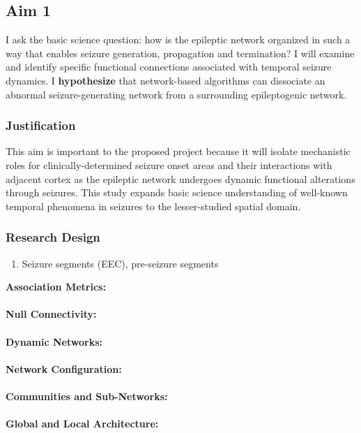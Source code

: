 \subsection{Aim 1}
I ask the basic science question: how is the epileptic network organized in such a way that enables seizure generation, propagation and termination? I will examine and identify specific functional connections associated with temporal seizure dynamics. I \textbf{hypothesize} that network-based algorithms can dissociate an abnormal seizure-generating network from a surrounding epileptogenic network.

\subsubsection{Justification}
This aim is important to the proposed project because it will isolate mechanistic roles for clinically-determined seizure onset areas and their interactions with adjacent cortex as the epileptic network undergoes dynamic functional alterations through seizures. This study expands basic science understanding of well-known temporal phenomena in seizures to the lesser-studied spatial domain.

\subsubsection{Research Design}
\begin{enumerate}
    \item Seizure segments (EEC), pre-seizure segments
\end{enumerate}
\textbf{Association Metrics:}
~\\
~\\
\textbf{Null Connectivity:}
~\\
~\\
\textbf{Dynamic Networks:}
~\\
~\\
\textbf{Network Configuration:}
~\\
~\\
\textbf{Communities and Sub-Networks:}
~\\
~\\
\textbf{Global and Local Architecture:}


